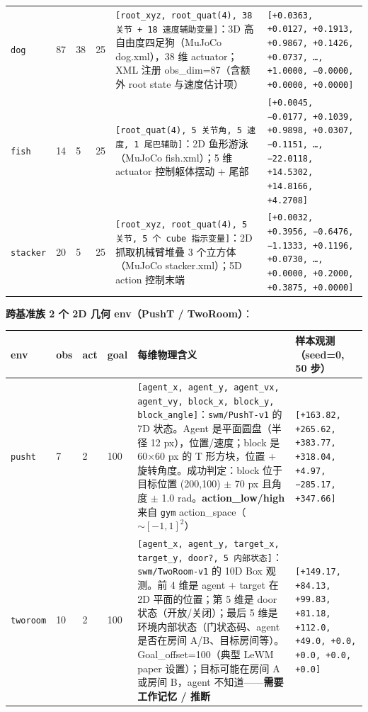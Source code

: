 \documentclass[11pt,a4paper]{article}
\begin{document}
\begin{longtable}{p{}p{}p{}p{}p{}p{}}
\texttt{dog}             & 87 & 38 & 25 & \texttt{[root\_xyz, root\_quat(4), 38 关节 + 18 速度辅助变量]}：3D 高自由度四足狗（MuJoCo dog.xml），38 维 actuator；XML 注册 obs\_dim=87（含额外 root state 与速度估计项） & \texttt{[+0.0363, +0.0127, +0.1913, +0.9867, +0.1426, +0.0737, …, +1.0000, −0.0000, +0.0000, +0.0000]} \\
\texttt{fish}            & 14 & 5 & 25 & \texttt{[root\_quat(4), 5 关节角, 5 速度, 1 尾巴辅助]}：2D 鱼形游泳（MuJoCo fish.xml）；5 维 actuator 控制躯体摆动 + 尾部 & \texttt{[+0.0045, −0.0177, +0.1039, +0.9898, +0.0307, −0.1151, …, −22.0118, +14.5302, +14.8166, +4.2708]} \\
\texttt{stacker}         & 20 & 5 & 25 & \texttt{[root\_xyz, root\_quat(4), 5 关节, 5 个 cube 指示变量]}：2D 抓取机械臂堆叠 3 个立方体（MuJoCo stacker.xml）；5D action 控制末端 & \texttt{[+0.0032, +0.3956, −0.6476, −1.1333, +0.1196, +0.0730, …, +0.0000, +0.2000, +0.3875, +0.0000]} \\
\bottomrule
\end{longtable}
\endgroup

\textbf{跨基准族 2 个 2D 几何 env（PushT / TwoRoom）}：

\begingroup\scriptsize
\begin{longtable}{p{}p{}p{}p{}p{}p{}}
\toprule
\textbf{env} & \textbf{obs} & \textbf{act} & \textbf{goal} & \textbf{每维物理含义} & \textbf{样本观测（seed=0, 50 步）} \\
\midrule
\endhead
\texttt{pusht}           & 7 & 2 & 100 & \texttt{[agent\_x, agent\_y, agent\_vx, agent\_vy, block\_x, block\_y, block\_angle]}：\texttt{swm/PushT-v1} 的 7D 状态。Agent 是平面圆盘（半径 12 px），位置/速度；block 是 60×60 px 的 T 形方块，位置 + 旋转角度。成功判定：block 位于目标位置 (200,100) $\pm$ 70 px 且角度 $\pm$ 1.0 rad。\textbf{action\_low/high} 来自 \texttt{gym} action\_space（$\sim [-1,1]^2$） & \texttt{[+163.82, +265.62, +383.77, +318.04, +4.97, −285.17, +347.66]} \\
\texttt{tworoom}         & 10 & 2 & 100 & \texttt{[agent\_x, agent\_y, target\_x, target\_y, door?, 5 内部状态]}：\texttt{swm/TwoRoom-v1} 的 10D Box 观测。前 4 维是 agent + target 在 2D 平面的位置；第 5 维是 door 状态（开放/关闭）；最后 5 维是环境内部状态（门状态码、agent 是否在房间 A/B、目标房间等）。Goal\_offset=100（典型 LeWM paper 设置）；目标可能在房间 A 或房间 B，agent 不知道——\textbf{需要工作记忆 / 推断} & \texttt{[+149.17, +84.13, +99.83, +81.18, +112.0, +49.0, +0.0, +0.0, +0.0, +0.0]} \\
\bottomrule
\end{longtable}
\endgroup
\end{document}
